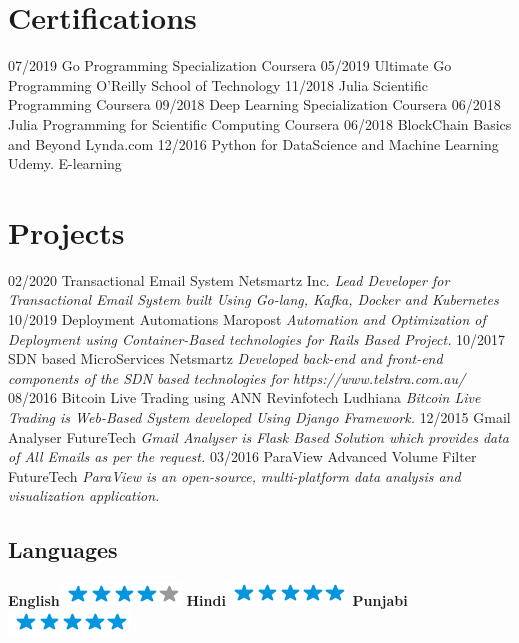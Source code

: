 \documentclass[]{friggeri-cv}
\begin{document}
\section{Certifications}
\begin{entrylist}
  \entry
    {07/2019}
    {Go Programming Specialization}
    {Coursera}
    {\emph{}}
  \entry
    {05/2019}
    {Ultimate Go Programming}
    {O'Reilly School of Technology}
    {\emph{}}
  \entry
    {11/2018}
    {Julia Scientific Programming}
    {Coursera}
    {\emph{}}
  \entry
    {09/2018}
    {Deep Learning Specialization}
    {Coursera}
    {\emph{}}
  \entry
    {06/2018}
    {Julia Programming for Scientific Computing}
    {Coursera}
    {\emph{}}
  \entry
    {06/2018}
    {BlockChain Basics and Beyond}
    {Lynda.com}
    {\emph{}}
  \entry
    {12/2016}
    {Python for DataScience and Machine Learning}
    {Udemy. E-learning}
    {\emph{}}
\end{entrylist}
\section{Projects}
\begin{entrylist}
\entry
   {02/2020}
   {Transactional Email System}
   {Netsmartz Inc.}
   {\emph{Lead Developer for Transactional Email System built Using Go-lang, Kafka, Docker and Kubernetes}}
\entry
   {10/2019}
   {Deployment Automations}
   {Maropost}
   {\emph{Automation and Optimization of Deployment using Container-Based technologies for Rails Based Project.}}
\entry
   {10/2017}
   {SDN based MicroServices}
   {Netsmartz}
   {\emph{Developed back-end and front-end components of the SDN based technologies for https://www.telstra.com.au/}}
 \entry
    {08/2016}
    {Bitcoin Live Trading using ANN}
    {Revinfotech Ludhiana}
    {\emph{Bitcoin Live Trading is Web-Based System developed Using Django Framework.}}
  \entry
    {12/2015}
    {Gmail Analyser}
    {FutureTech}
    {\emph{Gmail Analyser is Flask Based Solution which provides data of All Emails
as per the request.}}
  \entry
    {03/2016}
    {ParaView Advanced Volume Filter}
    {FutureTech}
    {\emph{ParaView is an open-source, multi-platform data analysis and visualization
application.}}
\end{entrylist}
\begin{aside}

   \section{Languages}
    \textbf{English}\includegraphics[scale=0.40]{img/4stars.png}
    \textbf{Hindi}\includegraphics[scale=0.40]{img/5stars.png}
    \textbf{Punjabi}\includegraphics[scale=0.40]{img/5stars.png}
\end{aside}
\end{document}
